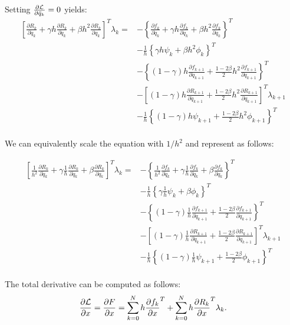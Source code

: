 \documentclass{beamer}
\newcommand{\pd}[2]{\frac{\partial #1}{\partial #2}}
\begin{document}
\begin{frame}[allowframebreaks]
{         Setting $\pd{\cal{L}}{\ddot{q}_k} = 0$ yields:
         \begin{equation}
           \begin{split}
             \left[ \pd{R_k}{\ddot{q}_k} + \gamma h \pd{R_k}{\dot{q}_k} + \beta h^2 \pd{R_k}{{q}_k} \right]^T \lambda_k = &- \left\{ \pd{f_k}{\ddot{q}_k} + \gamma h \pd{f_k}{\dot{q}_k} + \beta h^2 \pd{f_k}{{q}_k} \right\}^T \\
             & -  \frac{1}{h}\left\{  \gamma h  \psi_k + \beta h^2   \phi_k \right\}^T\\
             & -  \left\{ (1-\gamma) h \pd{f_{k+1}}{\dot{q}_{k+1}} + \frac{1-2\beta}{2} h^2 \pd{f_{k+1}}{{q}_{k+1}} \right\}^T \\
                          & -  \left[ (1-\gamma) h \pd{R_{k+1}}{\dot{q}_{k+1}} + \frac{1-2\beta}{2} h^2 \pd{R_{k+1}}{{q}_{k+1}} \right]^T\lambda_{k+1} \\
             & -  \frac{1}{h} \left\{ (1-\gamma) h \psi_{k+1} + \frac{1-2\beta}{2} h^2 \phi_{k+1} \right\}^T\\
           \end{split}
         \end{equation}

         We can equivalently scale the equation with $1/h^2$ and represent as follows:
         
         \begin{equation}
           \begin{split}
             \left[ \frac{1}{h^2} \pd{R_k}{\ddot{q}_k} + \gamma \frac{1}{h} \pd{R_k}{\dot{q}_k} + \beta \pd{R_k}{{q}_k} \right]^T \lambda_k = &- \left\{ \frac{1}{h^2}  \pd{f_k}{\ddot{q}_k} + \gamma \frac{1}{h} \pd{f_k}{\dot{q}_k} + \beta \pd{f_k}{{q}_k} \right\}^T \\
             & -  \frac{1}{h}\left\{  \gamma \frac{1}{h}  \psi_k + \beta   \phi_k \right\}^T\\
             & -  \left\{ (1-\gamma) \frac{1}{h} \pd{f_{k+1}}{\dot{q}_{k+1}} + \frac{1-2\beta}{2} \pd{f_{k+1}}{{q}_{k+1}} \right\}^T \\
                          & -  \left[ (1-\gamma) \frac{1}{h} \pd{R_{k+1}}{\dot{q}_{k+1}} + \frac{1-2\beta}{2} \pd{R_{k+1}}{{q}_{k+1}} \right]^T\lambda_{k+1} \\
             & -  \frac{1}{h} \left\{ (1-\gamma) \frac{1}{h} \psi_{k+1} + \frac{1-2\beta}{2} \phi_{k+1} \right\}^T\\
           \end{split}
         \end{equation}
         
         The total derivative can be computed as follows:
         $$\pd{\cal{L}}{x} = \pd{F}{x} = \sum_{k=0}^N h \pd{f_k}{x}^T + \sum_{k=0}^N h
         \pd{R_k}{x}^T \lambda_k.$$
  }
  
\end{frame}
\end{document}
